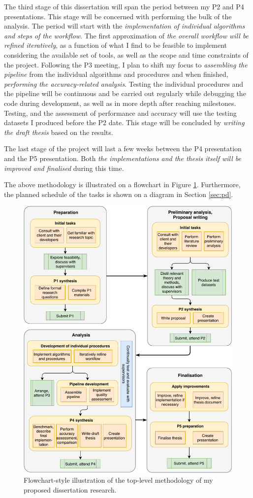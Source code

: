 The third stage of this dissertation will span the period between my P2 and P4 presentations. This stage will be concerned with performing the bulk of the analysis. The period will start with the \textit{implementation of individual algorithms and steps of the workflow}. The first approximation of \textit{the overall workflow will be refined iteratively}, as a function of what I find to be feasible to implement considering the available set of tools, as well as the scope and time constraints of the project. Following the P3 meeting, I plan to shift my focus to \textit{assembling the pipeline} from the individual algorithms and procedures and when finished, \textit{performing the accuracy-related analysis}. Testing the individual procedures and the pipeline will be continuous and be carried out regularly while debugging the code during development, as well as in more depth after reaching milestones. Testing, and the assessment of performance and accuracy will use the testing datasets I produced before the P2 date. This stage will be concluded by \textit{writing the draft thesis} based on the results.

The last stage of the project will last a few weeks between the P4 presentation and the P5 presentation. Both \textit{the implementations and the thesis itself will be improved and finalised} during this time.

The above methodology is illustrated on a flowchart in Figure \ref{fig:methodflow}. Furthermore, the planned schedule of the tasks is shown on a diagram in Section \ref{sec:pd}.

\begin{figure}[]
    \centering
    \includegraphics[width=0.8\linewidth]{p2/figs/methodology.pdf}
    \caption{Flowchart-style illustration of the top-level methodology of my proposed dissertation research.}
    \label{fig:methodflow}
\end{figure}

